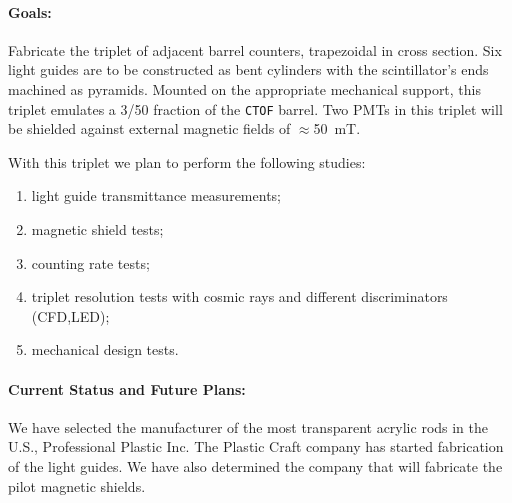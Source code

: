 \documentclass[12pt]{article}
\begin{document}
\paragraph{Goals:} Fabricate the triplet of adjacent barrel counters,  
trapezoidal in cross section.  Six light guides are to be constructed as
bent cylinders with the scintillator's ends machined as pyramids.  Mounted 
on the appropriate mechanical support, this triplet emulates a 3/50
fraction of the {\tt CTOF} barrel.  Two PMTs in this triplet will be 
shielded against external magnetic fields of $\approx$50~mT.

With this triplet we plan to perform the following studies: 

\begin{enumerate}
  \item light guide transmittance measurements;
  \item magnetic shield tests;
  \item counting rate tests;
  \item triplet resolution tests with cosmic rays and different 
        discriminators (CFD,LED);
  \item mechanical design tests.
\end{enumerate}

\paragraph{Current Status and Future Plans:} 
We have selected the manufacturer of the most transparent acrylic rods in 
the U.S., Professional Plastic Inc.  The Plastic Craft company has started  
fabrication of the light guides.  We have also determined the company that 
will fabricate the pilot magnetic shields.
\end{document}
